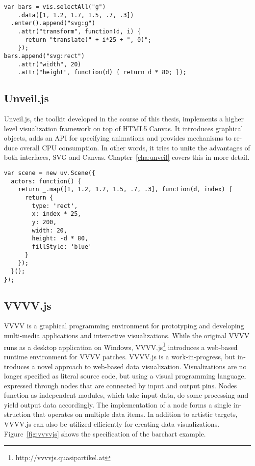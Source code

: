 \begin{english}
\begin{verbatim}
var bars = vis.selectAll("g")
    .data([1, 1.2, 1.7, 1.5, .7, .3])
  .enter().append("svg:g")
    .attr("transform", function(d, i) {
      return "translate(" + i*25 + ", 0)"; 
    });
bars.append("svg:rect")
    .attr("width", 20)
    .attr("height", function(d) { return d * 80; });
\end{verbatim}


\subsection{Unveil.js}

Unveil.js, the toolkit developed in the course of this thesis, implements a higher level visualization framework on top of HTML5 Canvas. It introduces graphical objects, adds an API for specifying animations and provides mechanisms to reduce overall CPU consumption. In other words, it tries to unite the advantages of both interfaces, SVG and Canvas. Chapter~\ref{cha:unveil} covers this in more detail.

\begin{verbatim}
var scene = new uv.Scene({
  actors: function() {
    return _.map([1, 1.2, 1.7, 1.5, .7, .3], function(d, index) {
      return {
        type: 'rect',
        x: index * 25,
        y: 200,
        width: 20,
        height: -d * 80,
        fillStyle: 'blue'
      }
    });
  }();
});
\end{verbatim}



\subsection{VVVV.js}

VVVV is a graphical programming environment for prototyping and developing multi-media applications and interactive visualizations. While the original VVVV runs as a desktop application on Windows, VVVV.js\footnote{http://vvvvjs.quasipartikel.at} introduces a web-based runtime environment for VVVV patches. VVVV.js is a work-in-progress, but introduces a novel approach to web-based data visualization. Visualizations are no longer specified as literal source code, but using a visual programming language, expressed through nodes that are connected by input and output pins. Nodes function as independent modules, which take input data, do some processing and yield output data accordingly. The implementation of a node forms a single instruction that operates on multiple data items. In addition to artistic targets, VVVV.js can also be utilized efficiently for creating data visualizations. Figure~\ref{fig:vvvvjs} shows the specification of the barchart example.


\end{english}

